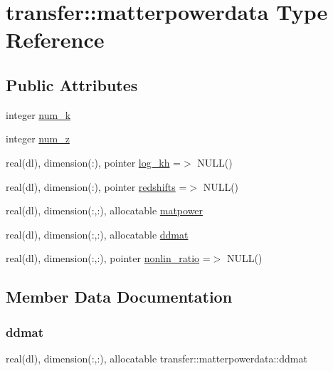 \hypertarget{structtransfer_1_1matterpowerdata}{}\section{transfer\+:\+:matterpowerdata Type Reference}
\label{structtransfer_1_1matterpowerdata}
\subsection*{Public Attributes}
\begin{DoxyCompactItemize}
\item 
integer \mbox{\hyperlink{structtransfer_1_1matterpowerdata_a5866f9a4f734df4773858f19f3fea87b}{num\+\_\+k}}
\item 
integer \mbox{\hyperlink{structtransfer_1_1matterpowerdata_adbda458a03ffc105a91a31d77c0b2a24}{num\+\_\+z}}
\item 
real(dl), dimension(\+:), pointer \mbox{\hyperlink{structtransfer_1_1matterpowerdata_a8ed1c386924716067286bb6461d79caa}{log\+\_\+kh}} =$>$ N\+U\+LL()
\item 
real(dl), dimension(\+:), pointer \mbox{\hyperlink{structtransfer_1_1matterpowerdata_ab6d55f419aaed4c08e8e64f386d600c9}{redshifts}} =$>$ N\+U\+LL()
\item 
real(dl), dimension(\+:,\+:), allocatable \mbox{\hyperlink{structtransfer_1_1matterpowerdata_a27840e1c7572a0bf9a69eed34950b485}{matpower}}
\item 
real(dl), dimension(\+:,\+:), allocatable \mbox{\hyperlink{structtransfer_1_1matterpowerdata_a676f6d752adc4ba6e9241f64e4511d46}{ddmat}}
\item 
real(dl), dimension(\+:,\+:), pointer \mbox{\hyperlink{structtransfer_1_1matterpowerdata_a89a632f9c3e8f7c9f2ad577902c196c7}{nonlin\+\_\+ratio}} =$>$ N\+U\+LL()
\end{DoxyCompactItemize}


\subsection{Member Data Documentation}
\mbox{\label{structtransfer_1_1matterpowerdata_a676f6d752adc4ba6e9241f64e4511d46}} 
\subsubsection{\texorpdfstring{ddmat}{ddmat}}
{\footnotesize\ttfamily real(dl), dimension(\+:,\+:), allocatable transfer\+::matterpowerdata\+::ddmat}

